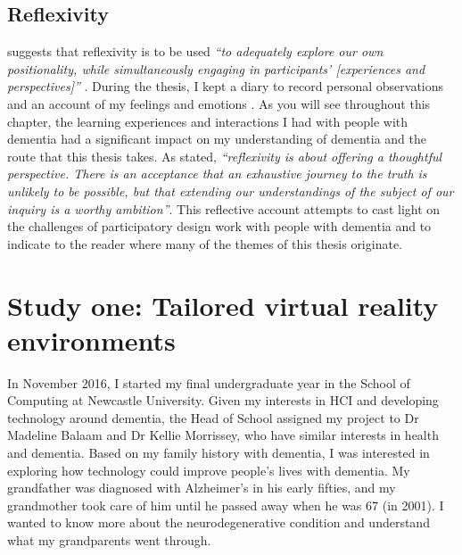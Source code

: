 \subsection{Reflexivity}
\label{CH4:Reflexivity}
\cite{everett2010lessons} suggests that reflexivity is to be used \textit{``to adequately explore our own positionality, while simultaneously engaging in participants' [experiences and perspectives]''} \citep[p.165]{everett2010lessons}. During the thesis, I kept a diary to record personal observations and an account of my feelings and emotions \citep{glaze2002ph}. As you will see throughout this chapter, the learning experiences and interactions I had with people with dementia had a significant impact on my understanding of dementia and the route that this thesis takes. As \cite{cousin2013reflexivity} stated, \textit{``reflexivity is about offering a thoughtful perspective. There is an acceptance that an exhaustive journey to the truth is unlikely to be possible, but that extending our understandings of the subject of our inquiry is a worthy ambition''}. This reflective account attempts to cast light on the challenges of participatory design work with people with dementia and to indicate to the reader where many of the themes of this thesis originate. 

\section{Study one: Tailored virtual reality environments}
\label{StudyOne}
In November 2016, I started my final undergraduate year in the School of Computing at Newcastle University. Given my interests in  HCI and developing technology around dementia, the Head of School assigned my project to Dr Madeline Balaam and Dr Kellie Morrissey, who have similar interests in health and dementia. Based on my family history with dementia, I was interested in exploring how technology could improve people's lives with dementia. My grandfather was diagnosed with  Alzheimer’s in his early fifties, and my grandmother took care of him until he passed away when he was 67 (in 2001). I wanted to know more about the neurodegenerative condition and understand what my grandparents went through.

